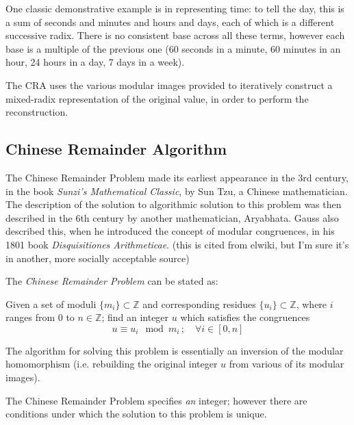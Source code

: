\documentclass[letterpaper,12pt,titlepage,oneside,final]{book}
\begin{document}
One classic demonstrative example is in representing time: to tell the day, this is a sum of seconds and minutes and hours and days, each of which is a different successive radix.  There is no consistent base across all these terms, however each base is a multiple of the previous one (60 seconds in a minute, 60 minutes in an hour, 24 hours in a day, 7 days in a week).     

The CRA uses the various modular images provided to iteratively construct a mixed-radix representation of the original value, in order to perform the reconstruction.


\subsection{Chinese Remainder Algorithm} 

The Chinese Remainder Problem made its earliest appearance in the 3rd century, in the book \textit{Sunzi's Mathematical Classic}, by Sun Tzu, a Chinese mathematician.  The description of the solution to algorithmic solution to this problem was then described in the 6th century by another mathematician, Aryabhata.  Gauss also described this, when he introduced the concept of modular congruences, in his 1801 book \textit{Disquisitiones Arithmeticae}.  (this is cited from elwiki, but I'm sure it's in another, more socially acceptable source)

\noindent The \textit{Chinese Remainder Problem} can be stated as: 
\begin{addmargin}[2em]{2em}%
  Given a set of moduli ${\{m_i\} \subset \mathbb{Z}}$ and corresponding residues ${\{u_i\} \subset \mathbb{Z}}$, where ${i}$ ranges from 0 to ${n \in \mathbb{Z}}$; find an integer ${u}$ which satisfies the congruences
  \begin{equation*}
    u \equiv u_i \mod m_i\, ; \quad \forall i \in [0, n]
  \end{equation*} 
\end{addmargin}

The algorithm for solving this problem is essentially an inversion of the modular homomorphism (i.e. rebuilding the original integer ${u}$ from various of its modular images).  

The Chinese Remainder Problem specifies \textit{an} integer; however there are conditions under which the solution to this problem is unique.   
\end{document}
